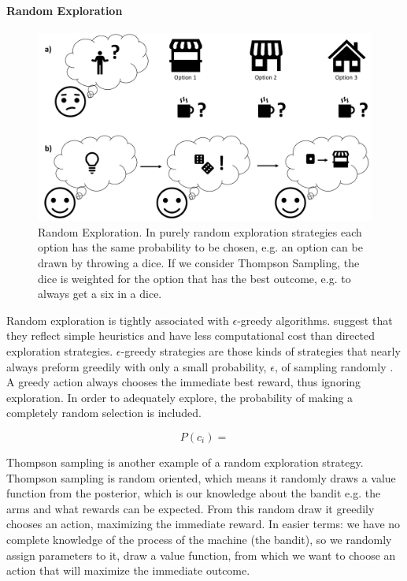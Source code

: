 \paragraph{Random Exploration}
\begin{figure}
    \centering
    \includegraphics[width=1\textwidth]{Plots/RandomExploration.pdf}
    \caption[Random Exploration]{Random Exploration. In purely random exploration strategies each option has the same probability to be chosen, e.g. an option can be drawn by throwing a dice. If we consider Thompson Sampling, the dice is weighted for the option that has the best outcome, e.g. to always get a six in a dice.}
    \label{fig:RandomExploration}
\end{figure}

Random exploration is tightly associated with $\epsilon$-greedy algorithms. \cite{wilson2014humans} suggest that they reflect simple heuristics and have less computational cost than directed exploration strategies.  
$\epsilon$-greedy strategies are those kinds of strategies that nearly always preform greedily with only a small probability, $\epsilon$, of sampling randomly \citep[pp.27-28]{sutton2018reinforcement}. A greedy action always chooses the immediate best reward, thus ignoring exploration. In order to adequately explore, the probability of making a completely random selection is included. 

\begin{equation}
P(c_i) = 
\end{equation}

Thompson \citeyear{thompson1933likelihood} sampling is another example of a random exploration strategy.
Thompson sampling is random oriented, which means it randomly draws a value function from the posterior, which is our knowledge about the bandit e.g. the arms and what rewards can be expected. %
From this random draw it greedily chooses an action, maximizing the immediate reward. In easier terms: we have no complete knowledge of the process of the machine (the bandit), so we randomly assign parameters to it, draw a value function, from which we want to choose an action that will maximize the immediate outcome.

